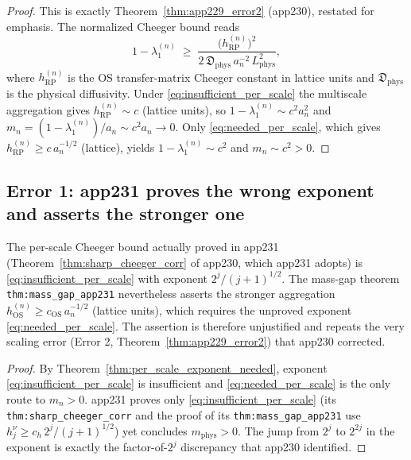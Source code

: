 \begin{proof}
This is exactly Theorem~\ref{thm:app229_error2} (app230), restated for
emphasis. The normalized Cheeger bound reads
\begin{equation*}
  1-\lambda_{1}^{(n)}\;\ge\;\frac{\bigl(h_{\mathrm{RP}}^{(n)}\bigr)^{2}}{
  2\,\mathfrak{D}_{\mathrm{phys}}\,a_{n}^{-2}\,L_{\mathrm{phys}}^{2}},
\end{equation*}
where $h_{\mathrm{RP}}^{(n)}$ is the OS transfer-matrix Cheeger constant
in lattice units and $\mathfrak{D}_{\mathrm{phys}}$ is the physical
diffusivity. Under \eqref{eq:insufficient_per_scale} the multiscale
aggregation gives $h_{\mathrm{RP}}^{(n)}\sim c$ (lattice units), so
$1-\lambda_{1}^{(n)}\sim c^{2}a_{n}^{2}$ and
$m_{n}= (1-\lambda_{1}^{(n)})/a_{n}\sim c^{2}a_{n}\to 0$. Only
\eqref{eq:needed_per_scale}, which gives
$h_{\mathrm{RP}}^{(n)}\ge c\,a_{n}^{-1/2}$ (lattice), yields
$1-\lambda_{1}^{(n)}\sim c^{2}$ and $m_{n}\sim c^{2}>0$.
\end{proof}

\subsection{Error 1: app231 proves the wrong exponent and asserts the
stronger one}

\begin{theorem}[Error 1]
\label{thm:app231_error1}
The per-scale Cheeger bound actually proved in app231
(Theorem~\ref{thm:sharp_cheeger_corr} of app230, which app231 adopts) is
\eqref{eq:insufficient_per_scale} with exponent $2^{j}/(j+1)^{1/2}$.
The mass-gap theorem \texttt{thm:mass\_gap\_app231} nevertheless asserts
the stronger aggregation
$h_{\mathrm{OS}}^{(n)}\ge c_{\mathrm{OS}}\,a_{n}^{-1/2}$ (lattice units),
which requires the unproved exponent \eqref{eq:needed_per_scale}. The
assertion is therefore unjustified and repeats the very scaling error
(Error 2, Theorem~\ref{thm:app229_error2}) that app230 corrected.
\end{theorem}

\begin{proof}
By Theorem~\ref{thm:per_scale_exponent_needed}, exponent
\eqref{eq:insufficient_per_scale} is insufficient and
\eqref{eq:needed_per_scale} is the only route to $m_{n}>0$. app231 proves only
\eqref{eq:insufficient_per_scale} (its \texttt{thm:sharp\_cheeger\_corr}
and the proof of its \texttt{thm:mass\_gap\_app231} use
$h_{j}^{\nu}\ge c_{h}\,2^{j}/(j+1)^{1/2}$) yet concludes
$m_{\mathrm{phys}}>0$. The jump from $2^{j}$ to $2^{2j}$ in the exponent
is exactly the factor-of-$2^{j}$ discrepancy that app230 identified.
\end{proof}

